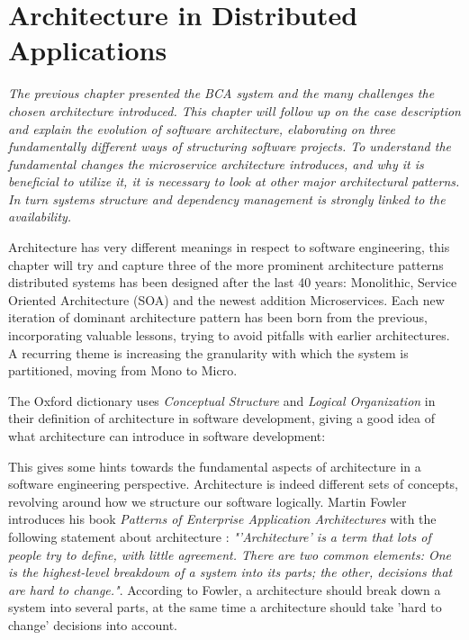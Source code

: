 \chapter{Architecture in Distributed Applications}
\label{ch:architecture}

\textit{The previous chapter presented the BCA system and the many challenges the chosen architecture introduced. This chapter will follow up on the case description and explain the evolution of software architecture, elaborating on three fundamentally different ways of structuring software projects. To understand the fundamental changes the microservice architecture introduces, and why it is beneficial to utilize it, it is necessary to look at other major architectural patterns. In turn systems structure and dependency management is strongly linked to the availability.}

Architecture has very different meanings in respect to software engineering, this chapter will try and capture three of the more prominent architecture patterns distributed systems has been designed after the last 40 years: Monolithic, Service Oriented Architecture (SOA) and the newest addition Microservices. Each new iteration of dominant architecture pattern has been born from the previous, incorporating valuable lessons, trying to avoid pitfalls with earlier architectures. A recurring theme is increasing the granularity with which the system is partitioned, moving from Mono to Micro.

The Oxford dictionary uses \textit{Conceptual Structure} and \textit{Logical Organization} in their definition of architecture in software development, giving a good idea of what architecture can introduce in software development:
 
 
This gives some hints towards the fundamental aspects of architecture in a software engineering perspective. Architecture is indeed different sets of concepts, revolving around how we structure our software logically. Martin Fowler introduces his book \textit{Patterns of Enterprise Application Architectures} with the following statement about architecture \cite[p.~1]{fowler2002patterns}: \textit{"'Architecture' is a term that lots of people try to define, with little agreement. There are two common elements: One is the highest-level breakdown of a system into its parts; the other, decisions that are hard to change."}. According to Fowler, a architecture should break down a system into several parts, at the same time a architecture should take 'hard to change' decisions into account. 

